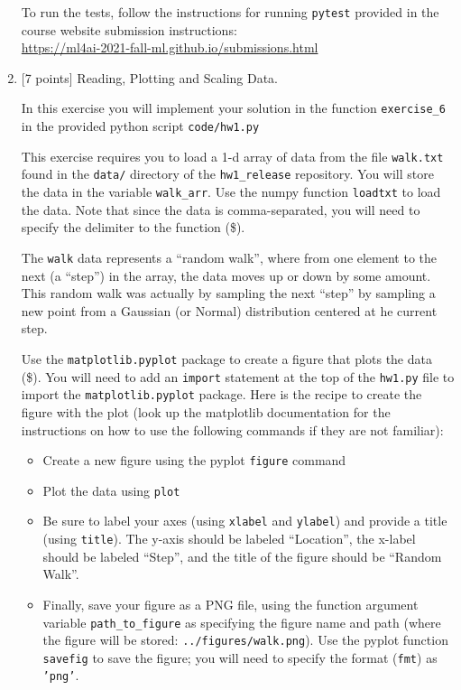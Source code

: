 \documentclass[10pt]{article}
\begin{document}
\begin{enumerate}
To run the tests, follow the instructions for running {\tt pytest} provided in the course website submission instructions:\\
\url{https://ml4ai-2021-fall-ml.github.io/submissions.html}

\vspace{1cm}



\item \label{prob:6} [7 points]
Reading, Plotting and Scaling Data.

In this exercise you will implement your solution in the function {\tt exercise\_6} in the provided python script {\tt code/hw1.py}

This exercise requires you to load a 1-d array of data from the file {\tt walk.txt} found in the {\tt data/} directory of the {\tt hw1\_release} repository. You will store the data in the variable {\tt walk\_arr}. Use the numpy function {\tt loadtxt} to load the data. Note that since the data is comma-separated, you will need to specify the delimiter to the function (\$).

The {\tt walk} data represents a ``random walk'', where from one element to the next (a ``step'') in the array, the data moves up or down by some amount. This random walk was actually by sampling the next ``step'' by sampling a new point from a Gaussian (or Normal) distribution centered at he current step.

Use the {\tt matplotlib.pyplot} package to create a figure that plots the data (\$). You will need to add an {\tt import} statement at the top of the {\tt hw1.py} file to import the {\tt matplotlib.pyplot} package. Here is the recipe to create the figure with the plot (look up the matplotlib documentation for the instructions on how to use the following commands if they are not familiar):
\begin{itemize}
\item Create a new figure using the pyplot {\tt figure} command
\item Plot the data using {\tt plot}
\item Be sure to label your axes (using {\tt xlabel} and {\tt ylabel}) and provide a title (using {\tt title}). The y-axis should be labeled ``Location'', the x-label should be labeled ``Step'', and the title of the figure should be ``Random Walk''.
\item Finally, save your figure as a PNG file, using the function argument variable {\tt path\_to\_figure} as specifying the figure name and path (where the figure will be stored: {\tt ../figures/walk.png}). Use the pyplot function {\tt savefig} to save the figure; you will need to specify the format ({\tt fmt}) as {\tt 'png'}.
\end{itemize}


\end{enumerate}
\end{document}

